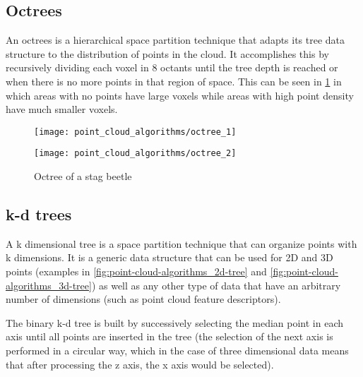 \subsection{Octrees}

An octrees is a hierarchical space partition technique that adapts its tree data structure to the distribution of points in the cloud. It accomplishes this by recursively dividing each voxel in 8 octants until the tree depth is reached or when there is no more points in that region of space. This can be seen in \cref{fig:point-cloud-algorithms_octree} in which areas with no points have large voxels while areas with high point density have much smaller voxels.

\begin{figure}[H]
	\centering
	\begin{minipage}[h]{.495\textwidth}
		\centering
		\texttt{[image: point\_cloud\_algorithms/octree\_1]}
	\end{minipage}\hfill
	\begin{minipage}[h]{.495\textwidth}
		\centering
		\texttt{[image: point\_cloud\_algorithms/octree\_2]}
	\end{minipage}
	\caption{Octree of a stag beetle\protect\footnotemark}
	\label{fig:point-cloud-algorithms_octree}
\end{figure}



\subsection{k-d trees}

A k dimensional tree is a space partition technique that can organize points with k dimensions. It is a generic data structure that can be used for 2D and 3D points (examples in \cref{fig:point-cloud-algorithms_2d-tree} and \cref{fig:point-cloud-algorithms_3d-tree}) as well as any other type of data that have an arbitrary number of dimensions (such as point cloud feature descriptors).

The binary k-d tree is built by successively selecting the median point in each axis until all points are inserted in the tree (the selection of the next axis is performed in a circular way, which in the case of three dimensional data means that after processing the z axis, the x axis would be selected).

